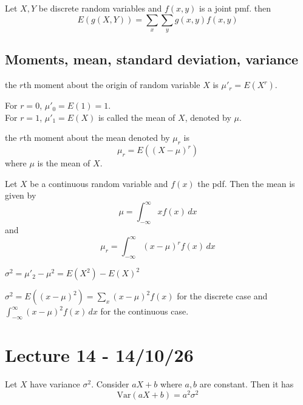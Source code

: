 \documentclass[11pt]{article}
\begin{document}
\begin{theorem}
    Let $X, Y$ be discrete random variables and $f(x,y)$ is a joint pmf. then
    \[
        E(g(X,Y)) = \sum_{x} \sum_{y} g(x,y)f(x,y)  
    \]
    
\end{theorem}
\subsection{Moments, mean, standard deviation, variance}
\begin{definition}
    the $r$th moment about the origin of random variable $X$ is $\mu'_r =E(X^r)$.
\end{definition}
\begin{remark}
    For $r = 0$, $\mu'_0 = E(1) = 1$.\\
    For $r = 1$, $\mu'_1 = E(X)$ is called the mean of $X$, denoted by $\mu$.\\
\end{remark}
\begin{definition}
    the $r$th moment about the mean denoted by $\mu_r$ is 
    \[
        \mu_r = E((X-\mu)^r)
    \] 
    where $\mu$ is the mean of $X$.
\end{definition}
\begin{definition}
    Let $X$ be a continuous random variable and $f(x)$ the pdf. Then the mean is given by
    \[
        \mu = \int_{-\infty}^{\infty} xf(x)\, dx
    \]
    and 
    \[
        \mu_r = \int_{-\infty}^{\infty} (x-\mu)^rf(x)\, dx
    \]
\end{definition}
\begin{theorem}
    $\sigma^2 = \mu'_2 - \mu^2 = E(X^2)-E(X)^2$
\end{theorem}
\begin{remark}
    $\sigma^2 = E((x-\mu)^2) = \sum_{x}(x-\mu)^2 f(x)$ for the discrete case and $\int_{-\infty}^{\infty} (x-\mu)^2f(x)\, dx$ for the continuous case.
\end{remark}


\section{Lecture 14 - 14/10/26}
\begin{theorem}
    Let $X$ have variance $\sigma^2$. Consider $aX + b$ where $a, b$ are constant. Then it has 
    \[
        \text{Var}(aX+b) = a^2 \sigma^2
    \]
\end{theorem}
\end{document}
